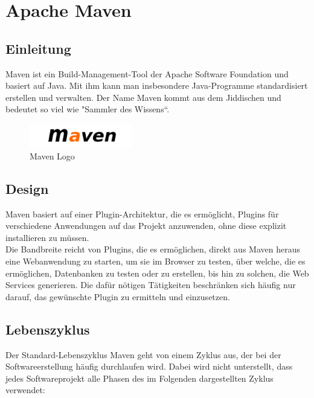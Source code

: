 

\section{Apache Maven}
\subsection{Einleitung}
Maven ist ein Build-Management-Tool der Apache Software Foundation und basiert auf Java. Mit ihm kann man insbesondere Java-Programme standardisiert erstellen und verwalten.
Der Name Maven kommt aus dem Jiddischen und bedeutet so viel wie "Sammler des Wissens“.


\begin{figure}[ht]
  \centering
    \includegraphics[width=0.4\textwidth]{MavenLogo}
  \caption{Maven Logo}
  \label{fig:MavenLogo}
\end{figure}


\subsection{Design}
Maven basiert auf einer Plugin-Architektur, die es ermöglicht, Plugins für verschiedene Anwendungen auf das Projekt anzuwenden, ohne diese explizit installieren zu müssen. 
\\Die Bandbreite reicht von Plugins, die es ermöglichen, direkt aus Maven heraus eine Webanwendung zu starten, um sie im Browser zu testen, über welche, die es ermöglichen, Datenbanken zu testen oder zu erstellen, bis hin zu solchen, die Web Services generieren. Die dafür nötigen Tätigkeiten beschränken sich häufig nur darauf, das gewünschte Plugin zu ermitteln und einzusetzen.
\newpage
\subsection{Lebenszyklus}
Der Standard-Lebenszyklus
Maven geht von einem Zyklus aus, der bei der Softwareerstellung häufig durchlaufen wird. Dabei wird nicht unterstellt, dass jedes Softwareprojekt alle Phasen des im Folgenden dargestellten Zyklus verwendet:

